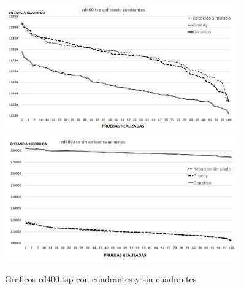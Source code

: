  \begin{figure}[hbtp]
    \centering
        \includegraphics[width=0.9\textwidth]{PruebasResultados/Experimentos_Graficos_Con/rd400.png}
        \includegraphics[width=0.9\textwidth]{PruebasResultados/Experimentos_Graficos_Sin/rd400.png}
        \caption{Graficos rd400.tsp con cuadrantes y sin cuadrantes}
        \label{fig:rd400_grafica.png}
\end{figure}
\newpage

